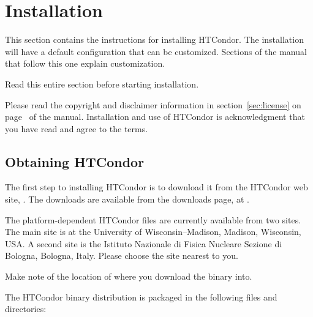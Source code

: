 \section{\label{sec:install}Installation}

This section contains the instructions for installing HTCondor.
The installation will have a default configuration that can
be customized.
Sections of the manual that follow this one explain customization.

Read this entire section before starting installation.

Please read the copyright and disclaimer information in 
section~\ref{sec:license} on
page~\pageref{sec:license} of the manual.
Installation and
use of HTCondor is acknowledgment that you have read and agree to the
terms.

\subsection{\label{sec:pre-install-procedure}
Obtaining HTCondor}
The first step to installing HTCondor is to download it from the HTCondor
web site, .
The downloads are available from the downloads page,
at .

The platform-dependent HTCondor files are currently available from two sites.
The main site is at the University of Wisconsin--Madison,
Madison, Wisconsin, USA.
A second site is the Istituto Nazionale di Fisica Nucleare Sezione di
Bologna, Bologna, Italy.
Please choose the site nearest to you.

Make note of the location of where you download the binary into.

The HTCondor binary distribution is packaged in the following files
and directories:

